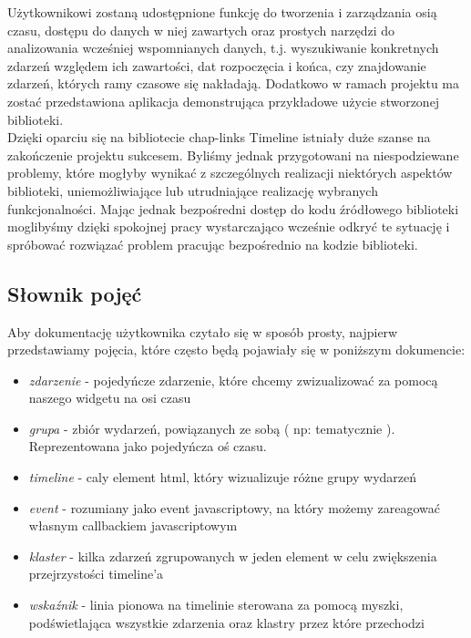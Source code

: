 \documentclass[polish,12pt]{aghthesis}
\begin{document}
Użytkownikowi zostaną udostępnione funkcję do tworzenia i zarządzania osią czasu, dostępu do danych w niej zawartych oraz prostych narzędzi do analizowania wcześniej wspomnianych danych, t.j. wyszukiwanie konkretnych zdarzeń względem ich zawartości, dat rozpoczęcia i końca, czy znajdowanie zdarzeń, których ramy czasowe się nakładają. Dodatkowo w ramach projektu ma zostać przedstawiona aplikacja demonstrująca przykładowe użycie stworzonej biblioteki.
\\

Dzięki oparciu się na bibliotecie chap-links Timeline istniały duże szanse na zakończenie projektu sukcesem. Byliśmy jednak przygotowani na niespodziewane problemy, które mogłyby wynikać z szczególnych realizacji niektórych aspektów biblioteki, uniemożliwiające lub utrudniające realizację wybranych funkcjonalności. Mając jednak bezpośredni dostęp do kodu źródłowego biblioteki moglibyśmy dzięki spokojnej pracy wystarczająco wcześnie odkryć te sytuację i spróbować rozwiązać problem pracując bezpośrednio na kodzie biblioteki.

\subsection{Słownik pojęć}

Aby dokumentację użytkownika czytało się w sposób prosty, najpierw przedstawiamy pojęcia, które często będą pojawiały się w poniższym dokumencie:

\begin{itemize}
	\item \textit{zdarzenie} - pojedyńcze zdarzenie, które chcemy zwizualizować za pomocą naszego widgetu na osi czasu
	\item \textit{grupa} - zbiór wydarzeń, powiązanych ze sobą ( np: tematycznie ). Reprezentowana jako pojedyńcza oś czasu.
	\item \textit{timeline} - caly element html, który wizualizuje różne grupy wydarzeń
	\item \textit{event} - rozumiany jako event javascriptowy, na który możemy zareagować własnym callbackiem javascriptowym
	\item \textit{klaster} - kilka zdarzeń zgrupowanych w jeden element w celu zwiększenia przejrzystości timeline’a
	\item \textit{wskaźnik} - linia pionowa na timelinie sterowana za pomocą myszki, podświetlająca wszystkie zdarzenia oraz klastry przez które przechodzi
\end{itemize}
\end{document}
